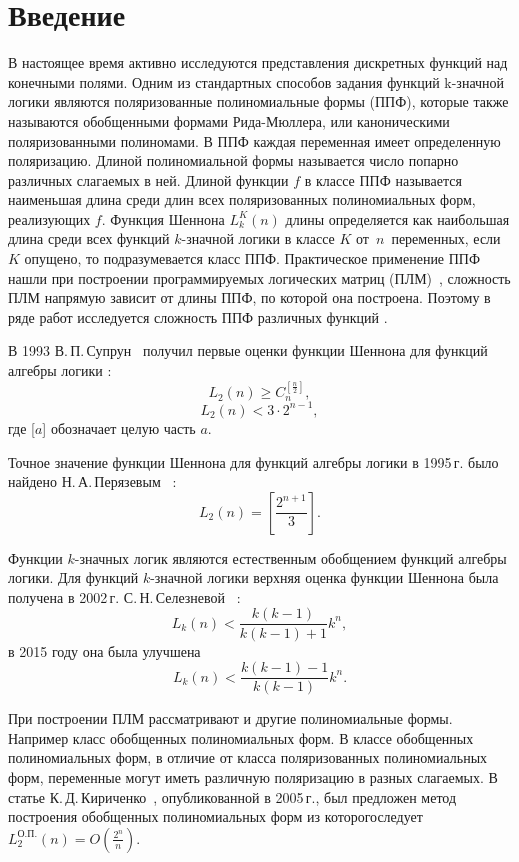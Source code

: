 \documentclass[bibliography=totoc, a4paper, 12pt]{extarticle}
\let\stdsection\section
\renewcommand\section{\newpage\stdsection}
\begin{document}
\setcounter{page}{2}
\setcounter{secnumdepth}{-1}

\tableofcontents

\section{Введение}

В настоящее время активно исследуются представления дискретных функций над
конечными полями. Одним из стандартных способов задания функций
k\nobreakdash-значной логики являются поляризованные полиномиальные формы (ППФ),
которые также называются обобщенными формами Рида-Мюллера, или каноническими
поляризованными полиномами. В ППФ каждая переменная имеет определенную
поляризацию. Длиной полиномиальной формы называется число попарно различных
слагаемых в ней. Длиной функции $f$ в классе ППФ называется наименьшая длина
среди длин всех поляризованных полиномиальных форм, реализующих $f$. Функция
Шеннона $L^K_k(n)$ длины определяется как наибольшая длина среди всех функций
$k$\nobreakdash-значной логики в классе $K$ от~$n$~переменных, если $K$ опущено,
то подразумевается класс ППФ. Практическое применение ППФ нашли при построении
программируемых логических матриц (ПЛМ)~\cite{ue04, sb90}, сложность ПЛМ
напрямую зависит от длины ППФ, по которой она построена. Поэтому в ряде работ
исследуется сложность ППФ различных функций
\cite{sv93,pn95,ss02,kk05,sd08,mn12,sm09}.

В 1993  В.\,П.\,Супрун~\cite{sv93} получил первые оценки функции Шеннона для
функций алгебры логики : $$ L_2(n) \geqslant C_n^{[\frac{n}{2}]}, $$ $$ L_2(n) <
3 \cdot 2^{n-1}, $$ где [$a$] обозначает целую часть $a$.

Точное значение функции Шеннона для функций алгебры логики в 1995\,г. было
найдено Н.\,А.\,Перязевым~\cite{pn95} :
$$
L_2(n) = \left[\frac{2^{n+1}}{3}\right].
$$

Функции $k$\nobreakdash-значных логик являются естественным обобщением функций
алгебры логики. Для функций $k$\nobreakdash-значной логики верхняя оценка
функции Шеннона была получена в 2002\,г. С.\,Н.\,Селезневой~\cite{ss02} :
$$
L_k(n) < \frac{k(k-1)}{k(k-1)+1}k^n,
$$
в 2015 году она была улучшена \cite{by15}
$$
L_k(n) < \frac{k(k-1)-1}{k(k-1)}k^n.
$$


При построении ПЛМ рассматривают и другие полиномиальные формы. Например класс
обобщенных полиномиальных форм. В классе обобщенных полиномиальных форм, в
отличие от класса поляризованных полиномиальных форм, переменные могут иметь
различную поляризацию в разных слагаемых. В статье
К.\,Д.\,Кириченко~\cite{kk05}, опубликованной в 2005\,г., был предложен метод
построения обобщенных полиномиальных форм из которогоследует
$L^{\text{О.П.}}_2(n) = O(\frac{2 ^ n}{n})$.
\end{document}
